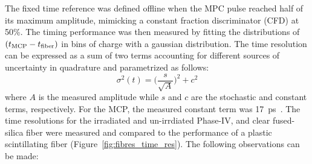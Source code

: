 \documentclass[a4paper,11pt]{article}
\begin{document}
The fixed time reference was defined offline when the MPC pulse reached half of its maximum amplitude, mimicking a constant fraction discriminator (CFD) at 50\%. The timing performance was then measured by fitting the distributions of $(t_{\rm MCP} - t_{\rm fiber})$ in bins of charge with a gaussian distribution.  The time resolution can be expressed as a sum of two terms accounting for different sources of uncertainty in quadrature and parametrized as follows:
\begin{equation}
    \sigma^2(t) = \bigg( \frac{s}{\sqrt{A}} \bigg)^2 + c^2
    \label{eq:eq}
\end{equation}
where $A$ is the measured amplitude while $s$ and $c$ are the stochastic and constant terms, respectively. For the MCP, the measured constant term was 17~ps~\cite{r-MCP}.  The time resolutions for the irradiated and un-irrdiated Phase-IV, and clear fused-silica fiber were measured and compared to the performance of a plastic scintillating fiber (Figure~\ref{fig:fibres_time_res}).  The following observations can be made:
\end{document}
